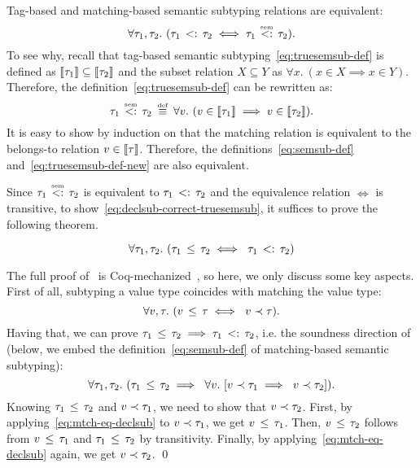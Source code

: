 Tag-based and matching-based semantic subtyping relations 
are equivalent:
\[
\forall \ty_1, \ty_2.\ 
(\bjsemsub{\ty_1}{\ty_2} \iff \bjtruesemsub{\ty_1}{\ty_2}).
\]
To see why, recall that tag-based semantic subtyping~\eqref{eq:truesemsub-def} 
is defined as $\llbracket \tau_1 \rrbracket \subseteq \llbracket \tau_2 \rrbracket$
and the subset relation $X \subseteq Y$ as
$\forall x.\ (x \in X \implies x \in Y)$.
Therefore, the definition~\eqref{eq:truesemsub-def} can be 
rewritten as:
\begin{equation}\label{eq:truesemsub-def-new}
\bjtruesemsub{\ty_1}{\ty_2} \;\defsign \;
\forall \vty.\ (\vty \in \interpty{\ty_1} \implies \vty \in \interpty{\ty_2}).
\end{equation}
It is easy to show by induction on \ty that the matching relation
is equivalent to the belongs-to relation $v \in \llbracket \tau \rrbracket$. 
Therefore, the definitions~\eqref{eq:semsub-def}
and~\eqref{eq:truesemsub-def-new} are also equivalent.

Since $\bjtruesemsub{\ty_1}{\ty_2}$ is equivalent to $\tau_1 \, <: \, \tau_2$
and the equivalence relation $\iff$ is transitive,
to show~\eqref{eq:declsub-correct-truesemsub},
it suffices to prove the following theorem.

\begin{theorem}\label{thm:declsub-correct}
	\[
	\forall \tau_1, \tau_2.\ (\tau_1 \, \leq \, \tau_2 \iff\ \tau_1 \, <: \, \tau_2)
	\]
\end{theorem}

The full proof of~ is 
Coq-mechanized~\cite{bib:MiniJlCoq},
so here, we only discuss some key aspects.
First of all, subtyping a value type coincides with matching the value type:
\begin{equation}\label{eq:mtch-eq-declsub}
\forall v, \tau.\ (v \, \leq \, \tau \iff\ v \prec \tau).
\end{equation}
Having that, we can prove 
$\tau_1 \, \leq \, \tau_2 \implies \tau_1 \, <: \, \tau_2$,
i.e. the soundness direction of~
(below, we embed the definition~\eqref{eq:semsub-def} of 
matching-based semantic subtyping):
\[
\forall \ty_1, \ty_2.\ 
(\bjsub{\ty_1}{\ty_2} \implies\ 
\forall \vty.\ [\bjmtch{\vty}{\ty_1} \implies\ \bjmtch{\vty}{\ty_2}]).
\]
Knowing $\tau_1 \, \leq \, \tau_2$ and $v \prec \tau_1$,
we need to show that $v \prec \tau_2$.
First, by applying~\eqref{eq:mtch-eq-declsub} to $v \prec \tau_1$,
we get $v \, \leq \, \tau_1$.
Then, $v \, \leq \, \tau_2$ follows from $v \, \leq \, \tau_1$ 
and $\tau_1 \, \leq \, \tau_2$ by transitivity.
Finally, by applying~\eqref{eq:mtch-eq-declsub} again,
we get $v \prec \tau_2$. \qed

